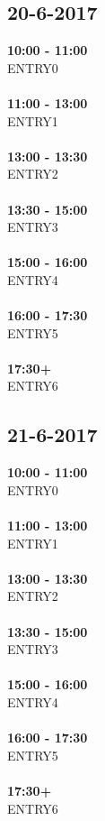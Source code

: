 \documentclass{uva-inf-article}
\begin{document}
\subsection{20-6-2017}
\textbf{10:00 - 11:00}\\
ENTRY0\\\\
\textbf{11:00 - 13:00}\\
ENTRY1\\\\
\textbf{13:00 - 13:30}\\
ENTRY2\\\\
\textbf{13:30 - 15:00}\\
ENTRY3\\\\
\textbf{15:00 - 16:00}\\
ENTRY4\\\\
\textbf{16:00 - 17:30}\\
ENTRY5\\\\
\textbf{17:30+}\\
ENTRY6\\
\subsection{21-6-2017}
\textbf{10:00 - 11:00}\\
ENTRY0\\\\
\textbf{11:00 - 13:00}\\
ENTRY1\\\\
\textbf{13:00 - 13:30}\\
ENTRY2\\\\
\textbf{13:30 - 15:00}\\
ENTRY3\\\\
\textbf{15:00 - 16:00}\\
ENTRY4\\\\
\textbf{16:00 - 17:30}\\
ENTRY5\\\\
\textbf{17:30+}\\
ENTRY6\\
\end{document}

